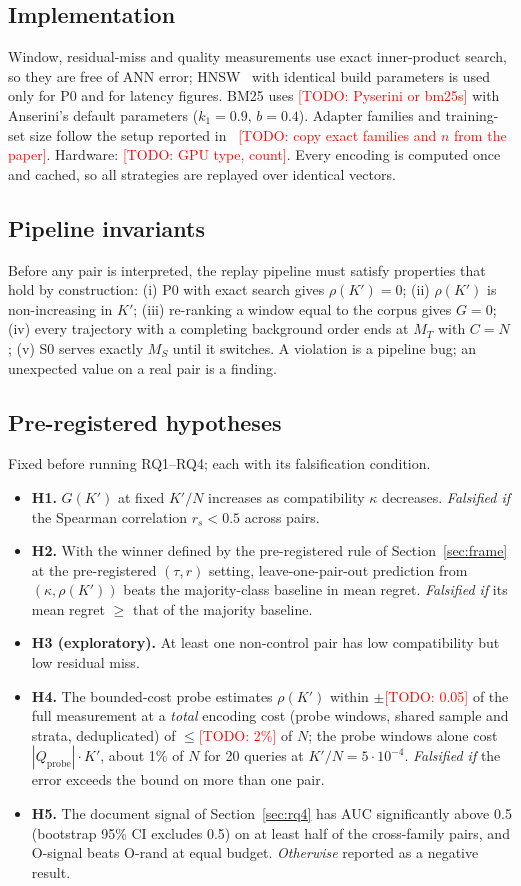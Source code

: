 \documentclass[conference]{IEEEtran}
\newcommand{\todo}[1]{\textcolor{red}{[TODO: #1]}}
\begin{document}
\subsection{Implementation}
Window, residual-miss and quality measurements use exact inner-product search, so
they are free of ANN error; HNSW~\cite{hnsw} with identical build parameters is used only
for P0 and for latency figures. BM25 uses \todo{Pyserini or bm25s} with Anserini's default
parameters ($k_1{=}0.9$, $b{=}0.4$). Adapter families and training-set size follow the
setup reported in~\cite{drift-adapter} \todo{copy exact families and $n$ from the paper}.
Hardware: \todo{GPU type, count}. Every encoding is computed once and cached, so all
strategies are replayed over identical vectors.

\subsection{Pipeline invariants}
Before any pair is interpreted, the replay pipeline must satisfy properties that hold
by construction: (i) P0 with exact search gives $\rho(K'){=}0$; (ii) $\rho(K')$ is
non-increasing in $K'$; (iii) re-ranking a window equal to the corpus gives $G{=}0$;
(iv) every trajectory with a completing background order ends at $M_T$ with $C{=}N$;
(v) S0 serves exactly $M_S$ until it switches. A violation is a pipeline bug; an
unexpected value on a real pair is a finding.

\subsection{Pre-registered hypotheses}
Fixed before running RQ1--RQ4; each with its falsification condition.
\begin{itemize}
\item \textbf{H1.} $G(K')$ at fixed $K'/N$ increases as compatibility $\kappa$
decreases. \emph{Falsified if} the Spearman correlation $r_s < 0.5$ across pairs.
\item \textbf{H2.} With the winner defined by the pre-registered rule of
Section~\ref{sec:frame} at the pre-registered $(\tau, r)$ setting, leave-one-pair-out prediction from $(\kappa, \rho(K'))$ beats the
majority-class baseline in mean regret. \emph{Falsified if} its mean regret $\ge$ that of
the majority baseline.
\item \textbf{H3 (exploratory).} At least one non-control pair has low compatibility
but low residual miss.
\item \textbf{H4.} The bounded-cost probe estimates $\rho(K')$ within $\pm$\todo{0.05}
of the full measurement at a \emph{total} encoding cost (probe windows, shared sample and
strata, deduplicated) of $\le$\todo{2\%} of $N$; the probe windows alone cost
$|Q_\text{probe}|\cdot K'$, about 1\% of $N$ for 20 queries at $K'/N = 5\cdot10^{-4}$. \emph{Falsified if} the error
exceeds the bound on more than one pair.
\item \textbf{H5.} The document signal of Section~\ref{sec:rq4} has AUC significantly
above 0.5 (bootstrap 95\% CI excludes 0.5) on at least half of the cross-family pairs,
and O-signal beats O-rand at equal budget. \emph{Otherwise} reported as a negative result.
\end{itemize}
\end{document}
